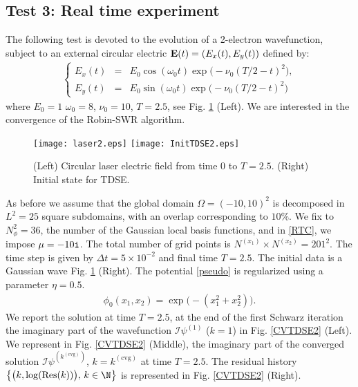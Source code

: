 \subsection{Test 3: Real time experiment}
The following test is devoted to the evolution of a 2-electron wavefunction, subject to an external circular electric ${\bf E}(t)=(E_x(t),E_y(t))$ defined by:
\begin{eqnarray*}
\left\{
\begin{array}{lcl}
E_x(t) & = & E_0\cos(\omega_0t)\exp\big(-\nu_0(T/2-t)^2\big), \\
E_y(t) & = & E_0\sin(\omega_0t)\exp\big(-\nu_0(T/2-t)^2\big)
\end{array}
\right.
\end{eqnarray*}
where $E_0=1$ $\omega_0=8$, $\nu_0=10$, $T=2.5$, see Fig. \ref{laser_circ} (Left). We are interested in the convergence of the Robin-SWR algorithm. 
\begin{figure}[!ht]
\begin{center}
\hspace*{1mm}\texttt{[image: laser2.eps]}
\hspace*{1mm}\texttt{[image: InitTDSE2.eps]}
\caption{(Left) Circular laser electric field from time $0$ to $T=2.5$. (Right) Initial state for TDSE.}
\label{laser_circ}
\end{center}
\end{figure}
 As before we assume that the global domain $\Omega=(-10,10)^2$ is decomposed in $L^2=25$ square subdomains, with an overlap corresponding to $10\%$. We fix to $N^2_{\phi}=36$, the number of the Gaussian local basis functions, and in \eqref{RTC}, we impose $\mu=-10{\tt i}$. The total number of grid points is $N^{(x_1)}\times N^{(x_2)}=201^2$. The time step is given by $\Delta t=5\times 10^{-2}$ and final time $T=2.5$. The initial data is a Gaussian wave Fig. \ref{laser_circ} (Right). The potential \eqref{pseudo} is regularized using a parameter $\eta=0.5$.
\begin{eqnarray*}
\phi_0(x_1,x_2) = \exp\big(-(x_1^2+x_2^2)\big).
\end{eqnarray*} 
We report the solution at time $T=2.5$, at the end of the first Schwarz iteration the imaginary part of the wavefunction $\mathcal{I}\psi^{(1)}$ ($k=1$) in Fig. \ref{CVTDSE2} (Left). We represent in Fig. \ref{CVTDSE2} (Middle), the imaginary part of the converged solution $\mathcal{I}\psi^{(k^{(\textrm{cvg})})}$, $k=k^{(\textrm{cvg})}$ at time $T=2.5$. The residual history $\big\{\big(k,\log(\textrm{Res}(k))\big), \, k \in \N\big\}$ is represented in Fig. \ref{CVTDSE2} (Right).
